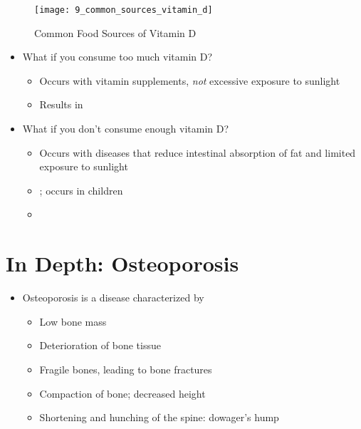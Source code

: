 \documentclass[title={Chapter 9}]{fdsn201notes}
\begin{document}
\begin{figure}[H]
	\centering
	\texttt{[image: 9\_common\_sources\_vitamin\_d]}
	\caption{Common Food Sources of Vitamin D}
	\label{fig:common-sources-vitamin-d}
\end{figure}

\begin{itemize}
	\item What if you consume too much vitamin D?
	\begin{itemize}
		\item Occurs with vitamin supplements, \textit{not} excessive exposure to sunlight
		\item Results in 
	\end{itemize}
	\item What if you don’t consume enough vitamin D?
	\begin{itemize}
		\item Occurs with diseases that reduce intestinal absorption of fat and limited exposure to sunlight
		\item {}; occurs in children
		\item {}
	\end{itemize}
\end{itemize}


\section{In Depth: Osteoporosis}\label{sec:in-depth:-osteoporosis}
\begin{itemize}
	\item Osteoporosis is a disease characterized by
	\begin{itemize}
		\item Low bone mass
		\item Deterioration of bone tissue
		\item Fragile bones, leading to bone fractures
		\item Compaction of bone; decreased height
		\item Shortening and hunching of the spine: dowager’s hump
	\end{itemize}
\end{itemize}
\end{document}
